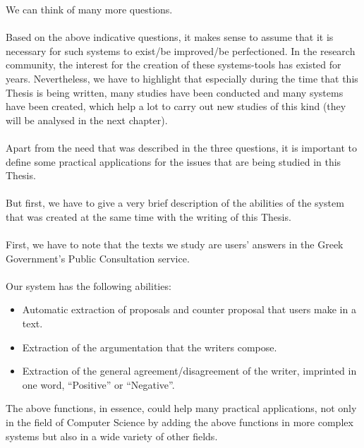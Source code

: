 We can think of many more questions.\\
\\
Based on the above indicative questions, it makes sense to assume that it is necessary for such systems to exist/be improved/be perfectioned. In the research community, the interest for the creation of these  systems-tools has existed for years. Nevertheless, we have to  highlight that especially during the time that this Thesis is being written, many studies have been conducted and many systems have been created, which help a lot to carry out new studies of this kind (they will be analysed in the next chapter).\\
\\
Apart from the need that was described in the three questions, it is important to define some practical applications for the issues that are being studied in this Thesis.\\
\\
But first, we have to give a very brief description of the abilities of the system that was created at the same time with the writing of this Thesis.\\%
\\
First, we have to note that the texts we study are users' answers in the Greek Government's Public Consultation service.\\
\\
Our system has the following abilities:\\
\begin{itemize}

	\item Automatic extraction of proposals and counter proposal that users make in a text.
	\item Extraction of the argumentation that the writers compose.
	\item Extraction of the general agreement/disagreement of the writer, imprinted in one word, ``Positive'' or ``Negative''.\\

\end{itemize}

The above functions, in essence, could help many practical applications, not only in the field of Computer Science by adding the above functions in more complex systems but also in a wide variety of other fields.\\

